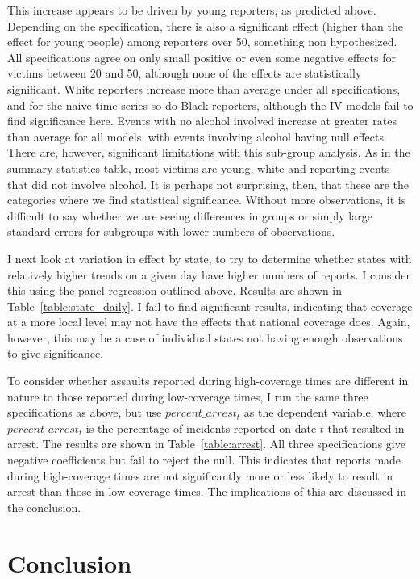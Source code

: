 \documentclass[AER,draftmode]{AEA}
\begin{document}
This increase appears to be driven by young reporters, as predicted above. Depending on the specification, there is also a significant effect (higher than the effect for young people) among reporters over 50, something non hypothesized. All specifications agree on only small positive or even some negative effects for victims between 20 and 50, although none of the effects are statistically significant. White reporters increase more than average under all specifications, and for the naive time series so do Black reporters, although the IV models fail to find significance here. Events with no alcohol involved increase at greater rates than average for all models, with events involving alcohol having null effects. There are, however, significant limitations with this sub-group analysis. As in the summary statistics table, most victims are young, white and reporting events that did not involve alcohol. It is perhaps not surprising, then, that these are the categories where we find statistical significance. Without more observations, it is difficult to say whether we are seeing differences in groups or simply large standard errors for subgroups with lower numbers of observations.

I next look at variation in effect by state, to try to determine whether states with relatively higher trends on a given day have higher numbers of reports.  I consider this using the  panel regression outlined above. Results are shown in Table~\ref{table:state_daily}. I fail to find significant results, indicating that coverage at a more local level may not have the effects that national coverage does. Again, however, this may be a case of individual states not having enough observations to give significance.

To consider whether assaults reported during high-coverage times are different in nature to those reported during low-coverage times, I run the same three specifications as above, but use $percent\_arrest_t$ as the dependent variable, where $percent\_arrest_t$ is the percentage of incidents reported on date $t$ that resulted in arrest. The results are shown in Table~\ref{table:arrest}. All three specifications give negative coefficients but fail to reject the null. This indicates that reports made during high-coverage times are not significantly more or less likely to result in arrest than those in low-coverage times. The implications of this are discussed in the conclusion. 

\clearpage
\section{Conclusion}
\end{document}
